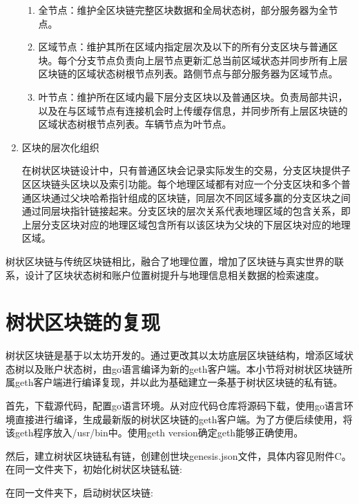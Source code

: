 \begin{enumerate}
\begin{enumerate}
  \item 全节点：维护全区块链完整区块数据和全局状态树，部分服务器为全节点。
  \item 区域节点：维护其所在区域内指定层次及以下的所有分支区块与普通区块。每个分支节点负责向上层节点更新汇总当前区域状态并同步所有上层区块链的区域状态树根节点列表。路侧节点与部分服务器为区域节点。
  \item 叶节点：维护所在区域内最下层分支区块以及普通区块。负责局部共识，以及在与区域节点有连接机会时上传缓存信息，并同步所有上层区块链的区域状态树根节点列表。车辆节点为叶节点。
 \end{enumerate}
 \item 区块的层次化组织 \par 
 在树状区块链设计中，只有普通区块会记录实际发生的交易，分支区块提供子区区块链头区块以及索引功能。每个地理区域都有对应一个分支区块和多个普通区块通过父块哈希指针组成的区块链，同层次不同区域多赢的分支区块之间通过同层块指针链接起来。分支区块的层次关系代表地理区域的包含关系，即上层分支区块对应的地理区域包含所有以该区块为父块的下层区块对应的地理区域。
\end{enumerate}

树状区块链与传统区块链相比，融合了地理位置，增加了区块链与真实世界的联系，设计了区块状态树和账户位置树提升与地理信息相关数据的检索速度。

\section{树状区块链的复现}
树状区块链是基于以太坊开发的。通过更改其以太坊底层区块链结构，增添区域状态树以及账户状态树，由go语言编译为新的geth客户端。本小节将对树状区块链所属geth客户端进行编译复现，并以此为基础建立一条基于树状区块链的私有链。

首先，下载源代码，配置go语言环境。从对应代码仓库将源码下载，使用go语言环境直接进行编译，生成最新版的树状区块链的geth客户端。为了方便后续使用，将该geth程序放入/usr/bin中。使用geth version确定geth能够正确使用。

然后，建立树状区块链私有链，创建创世块genesis.json文件，具体内容见附件C。
在同一文件夹下，初始化树状区块链私链:
\begin{center}
\end{center}

在同一文件夹下，启动树状区块链:
\begin{center}
\end{center}

